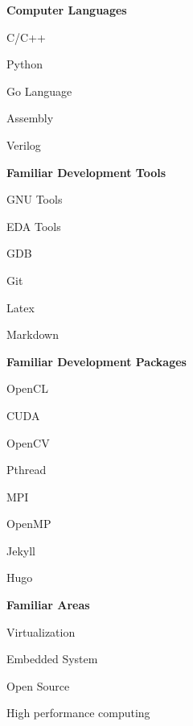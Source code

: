 \documentclass[a4paper,12pt,final]{memoir}
\newcommand{\Sep}{\vspace{1.5em}}
\newcommand{\SmallSep}{\vspace{0.5em}}
\newcommand{\CVSection}[1]
	{\Large\textbf{#1}\par
	\SmallSep\normalsize\normalfont}
\newcommand{\CVItem}[1]
	{\textbf{\color{RoyalBlue} #1}}
\begin{document}
\CVItem{Computer Languages}
\begin{multicols}{3}
\begin{compactitem}[\color{RoyalBlue}$\circ$]
	\item C/C++ 
	\item Python 
	\item Go Language
	\item Assembly
	\item Verilog
\end{compactitem}
\end{multicols}
\SmallSep
\CVItem{Familiar Development Tools}
\begin{multicols}{3}
\begin{compactitem}[\color{RoyalBlue}$\circ$]
	\item GNU Tools
	\item EDA Tools
	\item GDB
	\item Git
	\item Latex
	\item Markdown
\end{compactitem}
\end{multicols}
\CVItem{Familiar Development Packages}
\begin{multicols}{3}
\begin{compactitem}[\color{RoyalBlue}$\circ$]
	\item OpenCL
	\item CUDA
	\item OpenCV
	\item Pthread
	\item MPI
	\item OpenMP
	\item Jekyll
	\item Hugo
\end{compactitem}
\end{multicols}
\CVItem{Familiar Areas}
\begin{multicols}{3}
\begin{compactitem}[\color{RoyalBlue}$\circ$]
	\item Virtualization
	\item Embedded System
	\item Open Source
	\item High performance computing
\end{compactitem}
\end{multicols}
\Sep 
\end{document}
